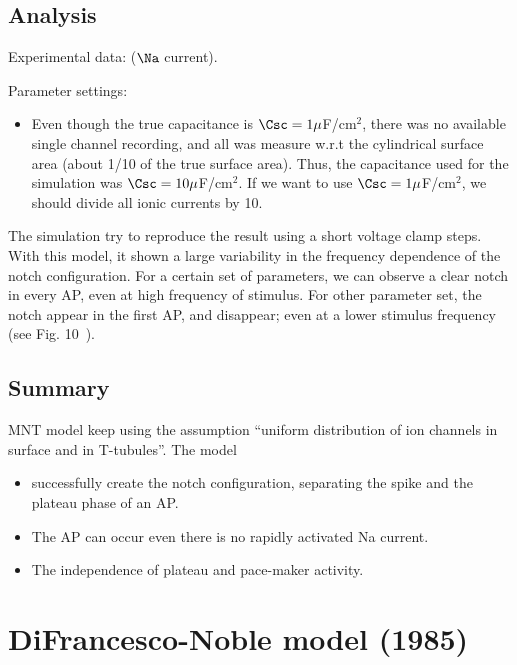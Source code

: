 \subsection{Analysis}
\label{sec:analysis-7}

Experimental data: \citep{weidmann1955cmp} ($\Na$ current).

Parameter settings:
\begin{itemize}
\item Even though the true capacitance is $\Csc=1\mu$F/cm$^2$, there
  was no available single channel recording, and all was measure w.r.t
  the cylindrical surface area (about 1/10 of the true surface
  area). Thus, the capacitance used for the simulation was $\Csc =
  10\mu$F/cm$^2$. If we want to use $\Csc=1\mu$F/cm$^2$, we should
  divide all ionic currents by 10. 
\end{itemize}

The simulation try to reproduce the result using a short voltage clamp
steps. With this model, it shown a large variability in the frequency
dependence of the notch configuration. For a certain set of
parameters, we can observe a clear notch in every AP, even at high
frequency of stimulus. For other parameter set, the notch appear in
the first AP, and disappear; even at a lower stimulus frequency (see
Fig. 10~\citep{mcallister1975rea}).

\subsection{Summary}
\label{sec:summary-6}

MNT model keep using the assumption ``uniform distribution of ion
channels in surface and in T-tubules''. The model 
\begin{itemize}
\item successfully create
  the notch configuration, separating the spike and the plateau phase of
  an AP. 
\item The AP can occur even there is no rapidly activated Na
  current. 

\item The independence of plateau and pace-maker activity.
\end{itemize}

\section{DiFrancesco-Noble  model (1985)}
\label{sec:difr-noble-purk}


